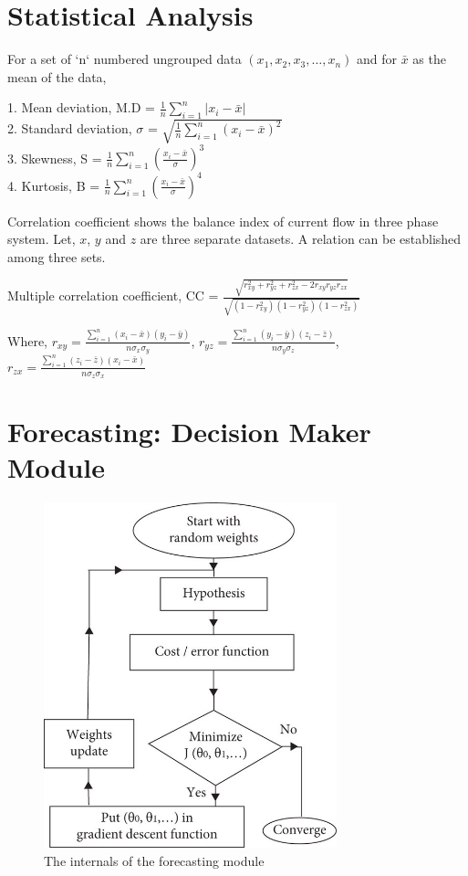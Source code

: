 \documentclass[a4paper,12pt,oneside]{book}
\begin{document}
\section{Statistical Analysis}
For a set of `n` numbered ungrouped data $(x_1, x_2, x_3, \ldots, x_n)$ and for $\bar{x}$ as the mean of the data,

1. Mean deviation, M.D = $\frac{1}{n}\sum_{i=1}^{n}|x_i - \bar{x}|$ \\
2. Standard deviation, $\sigma$ = $\sqrt{\frac{1}{n}\sum_{i=1}^{n}(x_i - \bar{x})^2}$\\
3. Skewness, S = $\frac{1}{n}\sum_{i=1}^{n}\left(\frac{x_i - \bar{x}}{\sigma}\right)^3$\\
4. Kurtosis, B = $\frac{1}{n}\sum_{i=1}^{n}\left(\frac{x_i - \bar{x}}{\sigma}\right)^4$

Correlation coefficient shows the balance index of current flow in three phase system. Let, $x$, $y$ and $z$ are three separate datasets. A relation can be established among three sets.

Multiple correlation coefficient, CC = $\frac{\sqrt{r_{xy}^2 + r_{yz}^2 + r_{zx}^2 - 2r_{xy}r_{yz}r_{zx}}}{\sqrt{(1-r_{xy}^2)(1-r_{yz}^2)(1-r_{zx}^2)}}$

Where, $r_{xy} = \frac{\sum_{i=1}^{n}(x_i - \bar{x})(y_i - \bar{y})}{n\sigma_x\sigma_y}$, $r_{yz} = \frac{\sum_{i=1}^{n}(y_i - \bar{y})(z_i - \bar{z})}{n\sigma_y\sigma_z}$, $r_{zx} = \frac{\sum_{i=1}^{n}(z_i - \bar{z})(x_i - \bar{x})}{n\sigma_z\sigma_x}$

\newpage
\section{Forecasting: Decision Maker Module}
\begin{figure}[htp]
\centering
\includegraphics[height=10cm]{Figures/Flow-chart-of-linear-regression.jpg} 
\caption{The internals of the forecasting module\cite{9270536}}
\label{fig:flowchart-linear-regression}
\end{figure}
\end{document}
